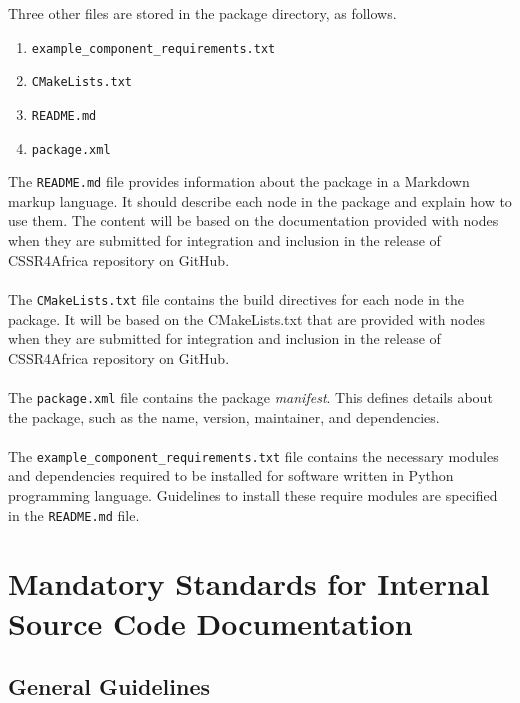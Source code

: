 \documentclass{CSSRforAfrica}
\newcommand{\blank}{~\\}
\begin{document}
\begin{appendices}
Three other files are stored in the package directory, as follows.
\begin{enumerate}
\item {\small \verb+example_component_requirements.txt+} \vspace{-2mm}
\item {\small \verb+CMakeLists.txt+} \vspace{-2mm}
\item {\small \verb+README.md+} \vspace{-2mm}
\item {\small \verb+package.xml+} 
\end{enumerate}
The {\small \verb+README.md+}  file  provides information about the package in a Markdown markup language. It should  describe each node in the package and explain how to use them.   The content will be based on the documentation provided with  nodes when they are submitted for integration and inclusion in the release of CSSR4Africa repository on GitHub. 
\blank
~
\blank
The {\small \verb+CMakeLists.txt+}  file contains the build directives for each node in the package.  It will be based on the CMakeLists.txt that are  provided with  nodes when they are submitted for integration and inclusion in the release of CSSR4Africa repository on GitHub. 
\blank
~
\blank
The  {\small \verb+package.xml+} file contains the package {\em manifest}. This defines details about the package, such as the name, version, maintainer, and dependencies.
\blank
~
\blank
The {\small \verb+example_component_requirements.txt+} file contains the necessary modules and dependencies required to be installed for software written in Python programming language. Guidelines to install these require modules are specified in the {\small \verb+README.md+} file.
\blank


\newpage 


\section{Mandatory Standards for Internal Source Code Documentation}
\label{appendix:documentation_standards}  
  
 \subsection{General Guidelines}


\end{appendices}
\end{document}
